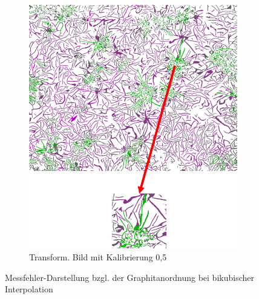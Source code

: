 \documentclass[
fontsize=10pt, 
listof = totoc,
parskip = half	
]{report}
\begin{document}
\begin{figure}[h]
\begin{subfigure}{0.33\textwidth}
	\end{subfigure}\hfill
	\begin{subfigure}{0.33\textwidth}
		\centering
		\includegraphics[scale=0.5]{pics/ClassificationCalib05.png}
		\caption{Transform. Bild mit Kalibrierung 0,5}
	\end{subfigure}
	\caption{Messfehler-Darstellung bzgl. der Graphitanordnung bei bikubischer Interpolation}
	\label{fig:ErrorAKL}
\end{figure}
\end{document}

